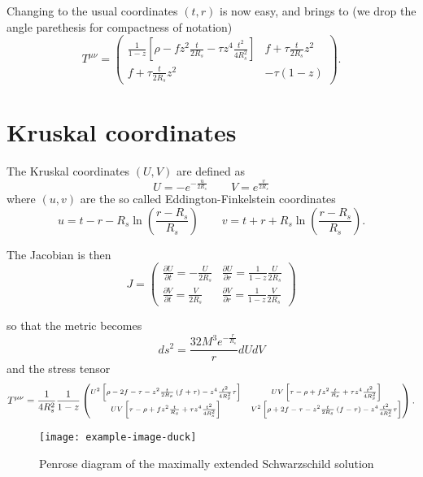 Changing to the usual coordinates \((t, r)\) is now easy, and brings to (we drop the angle parethesis for compactness of notation)
\[
   T^{\mu\nu} = \begin{pmatrix}
    \frac{1}{1 - z}\left[\rho - f z^2 \frac{t}{2R_s} - \tau z^4\frac{t^2}{4R_s^2}\right] & f + \tau \frac{t}{2R_s}z^2 \\
    f + \tau \frac{t}{2R_s}z^2  & -\tau(1 - z)
   \end{pmatrix}.
\]

\section{Kruskal coordinates}
The Kruskal coordinates \((U, V)\) are defined as 
\[
   U = - e^{-\frac{u}{2R_s}} \quad \quad V = e^{\frac{v}{2R_s}}
\]
where \((u,v)\) are the so called Eddington-Finkelstein coordinates
\[
u = t - r - R_s\ln\left(\frac{r - R_s}{R_s}\right)    \quad \quad 
v = t + r + R_s\ln\left(\frac{r - R_s}{R_s}\right).
\]

The Jacobian is then
\[
J = \begin{pmatrix}
    \frac{\partial U}{\partial t} = - \frac{U}{2R_s} & \frac{\partial U}{\partial r} = \frac{1}{1 - z} \frac{U}{2R_s} \\
    \frac{\partial V}{\partial t} = \frac{V}{2R_s} & \frac{\partial V}{\partial r} = \frac{1}{1 - z} \frac{V}{2R_s}
\end{pmatrix}    
\]

so that the metric becomes
\[
    ds^2 = \frac{32M^3e^{-\frac{r}{R_s}}}{r}dUdV
\]
and the stress tensor
\[
    \scriptsize
    T^{\mu\nu} = \frac{1}{4R_s^2}\frac{1}{1 - z} 
    \begin{pmatrix}
        U^2 \left[\rho - 2f - \tau - z^2 \frac{t}{2R_s} \left(f + \tau\right) - z^4\frac{t^2}{4R_s^2}\tau \right] &
        UV\left[\tau - \rho + fz^2 \frac{t}{R_s} + \tau z^4\frac{t^2}{4R_s^2}\right] \\ 
        UV\left[\tau - \rho + fz^2 \frac{t}{R_s} + \tau z^4\frac{t^2}{4R_s^2}\right] &
        V^2 \left[\rho + 2f - \tau - z^2 \frac{t}{2R_s} \left(f - \tau\right) - z^4\frac{t^2}{4R_s^2}\tau \right]
    \end{pmatrix}.
\]

\begin{figure}
    \centering
    \texttt{[image: example-image-duck]}
    \caption{Penrose diagram of the maximally extended Schwarzschild solution}
\end{figure}

